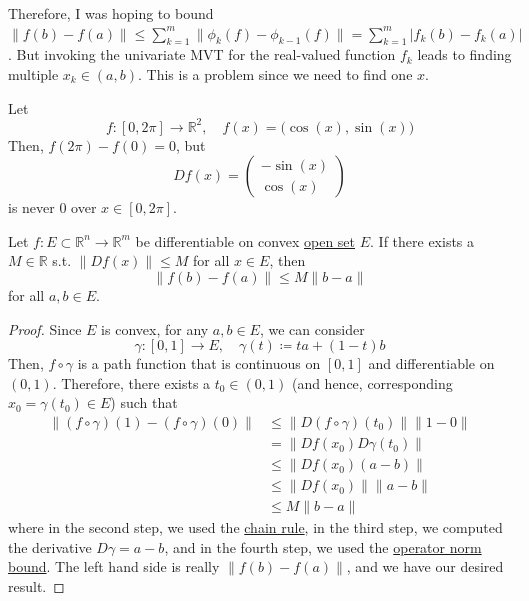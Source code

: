 	Therefore, I was hoping to bound $\| f(b) - f(a) \| \leq \sum_{k=1}^m \| \phi_k (f) - \phi_{k-1}(f)\| = \sum_{k=1}^m | f_k (b) - f_k (a) |$. But invoking the univariate MVT for the real-valued function $f_k$ leads to finding multiple $x_k \in (a, b)$. This is a problem since we need to find one $x$. 

	\begin{example}
	  \label{ex:mvt-inequality-does-not-hold-on-circle}
	  Let 
		\begin{equation}
			f: [0, 2\pi] \to \mathbb{R}^2, \quad f(x) = \big(\cos(x), \sin(x)\big)
		\end{equation}
		Then, $f(2\pi) - f(0) = 0$, but 
		\begin{equation}
			Df(x) = \begin{pmatrix} -\sin(x) \\ \cos(x) \end{pmatrix}
		\end{equation}
		is never $0$ over $x \in [0, 2\pi]$. 
	\end{example}

	\begin{theorem}
	  \label{thm:mean-value-theorem}
		Let $f: E \subset \mathbb{R}^n \to \mathbb{R}^m$ be differentiable on convex \hyperref[pst-def:open-set]{open set} $E$. If there exists a $M \in \mathbb{R}$ s.t. $\|Df(x)\| \leq M$ for all $x \in E$, then 
		\begin{equation}
		  \|f(b) - f(a)\| \leq M \|b - a\|
		\end{equation}
		for all $a, b \in E$. 
	\end{theorem}
	\begin{proof}
		Since $E$ is convex, for any $a, b \in E$, we can consider 
		\begin{equation}
			\gamma: [0, 1] \to E, \quad \gamma(t) \coloneqq t a + (1 - t) b
		\end{equation}
		Then, $f \circ \gamma$ is a path function that is continuous on $[0, 1]$ and differentiable on $(0, 1)$. Therefore, there exists a $t_0 \in (0, 1)$ (and hence, corresponding $x_0 = \gamma(t_0) \in E$) such that 
		\begin{align}
			\|(f \circ \gamma)(1) - (f \circ \gamma)(0)\| 
				& \leq \|D (f \circ \gamma)(t_0)\| \| 1 - 0 \| \\ 
				& = \| Df(x_0) D\gamma(t_0) \| \\ 
				& \leq \|Df(x_0) (a - b)\| \\ 
				& \leq \|Df(x_0)\| \|a - b\| \\ 
				& \leq M \|b - a\|
		\end{align}
		where in the second step, we used the \hyperref[thm:chain-rule]{chain rule}, in the third step, we computed the derivative $D\gamma = a - b$, and in the fourth step, we used the \hyperref[lin-thm:operator_norm_bound]{operator norm bound}. The left hand side is really $\|f(b) - f(a)\|$, and we have our desired result. 
	\end{proof}

